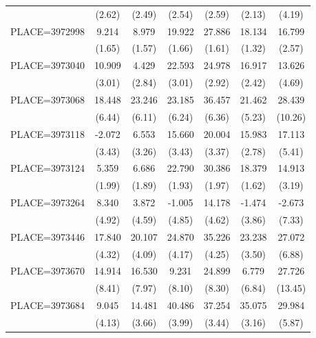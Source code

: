 {\begin{tabular}{l*{6}{c}}
                    &      (2.62)&      (2.49)&      (2.54)&      (2.59)&      (2.13)&      (4.19)\\
PLACE=3972998       &       9.214&       8.979&      19.922&      27.886&      18.134&      16.799\\
                    &      (1.65)&      (1.57)&      (1.66)&      (1.61)&      (1.32)&      (2.57)\\
PLACE=3973040       &      10.909&       4.429&      22.593&      24.978&      16.917&      13.626\\
                    &      (3.01)&      (2.84)&      (3.01)&      (2.92)&      (2.42)&      (4.69)\\
PLACE=3973068       &      18.448&      23.246&      23.185&      36.457&      21.462&      28.439\\
                    &      (6.44)&      (6.11)&      (6.24)&      (6.36)&      (5.23)&     (10.26)\\
PLACE=3973118       &      -2.072&       6.553&      15.660&      20.004&      15.983&      17.113\\
                    &      (3.43)&      (3.26)&      (3.43)&      (3.37)&      (2.78)&      (5.41)\\
PLACE=3973124       &       5.359&       6.686&      22.790&      30.386&      18.379&      14.913\\
                    &      (1.99)&      (1.89)&      (1.93)&      (1.97)&      (1.62)&      (3.19)\\
PLACE=3973264       &       8.340&       3.872&      -1.005&      14.178&      -1.474&      -2.673\\
                    &      (4.92)&      (4.59)&      (4.85)&      (4.62)&      (3.86)&      (7.33)\\
PLACE=3973446       &      17.840&      20.107&      24.870&      35.226&      23.238&      27.072\\
                    &      (4.32)&      (4.09)&      (4.17)&      (4.25)&      (3.50)&      (6.88)\\
PLACE=3973670       &      14.914&      16.530&       9.231&      24.899&       6.779&      27.726\\
                    &      (8.41)&      (7.97)&      (8.10)&      (8.30)&      (6.84)&     (13.45)\\
PLACE=3973684       &       9.045&      14.481&      40.486&      37.254&      35.075&      29.984\\
                    &      (4.13)&      (3.66)&      (3.99)&      (3.44)&      (3.16)&      (5.87)\\

\end{tabular}}
